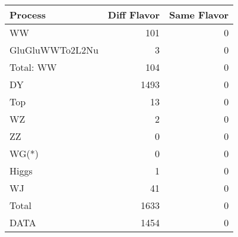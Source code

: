 \begin{table}[ht]
	\centering
\begin{tabular}{lrr}

         Process &  Diff Flavor &  Same Flavor \\
		\hline
              WW &          101 &            0 \\
 GluGluWWTo2L2Nu &            3 &            0 \\
\hline
       Total: WW &          104 &            0 \\
              DY &         1493 &            0 \\
             Top &           13 &            0 \\
              WZ &            2 &            0 \\
              ZZ &            0 &            0 \\
           WG(*) &            0 &            0 \\
           Higgs &            1 &            0 \\
              WJ &           41 &            0 \\
\hline
           Total &         1633 &            0 \\
            DATA &         1454 &            0 \\


\end{tabular}

\end{table}